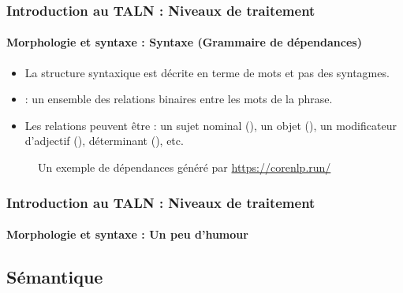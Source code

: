 \documentclass[xcolor=table]{beamer}
\begin{document}
\begin{frame}
\frametitle{Introduction au TALN : Niveaux de traitement}
\framesubtitle{Morphologie et syntaxe : Syntaxe (Grammaire de dépendances)}

\begin{itemize}
	\item La structure syntaxique est décrite en terme de mots et pas des syntagmes.
	\item {} : un ensemble des relations binaires entre les mots de la phrase.
	\item Les relations peuvent être : un sujet nominal (), un objet (), un modificateur d'adjectif (), déterminant (), etc.
\end{itemize}

\begin{figure}
	\caption{Un exemple de dépendances généré par \url{https://corenlp.run/}}
\end{figure}

\end{frame}

\begin{frame}
\frametitle{Introduction au TALN : Niveaux de traitement}
\framesubtitle{Morphologie et syntaxe : Un peu d'humour}

\begin{center}
\end{center}

\end{frame}

\subsection{Sémantique}
\end{document}
